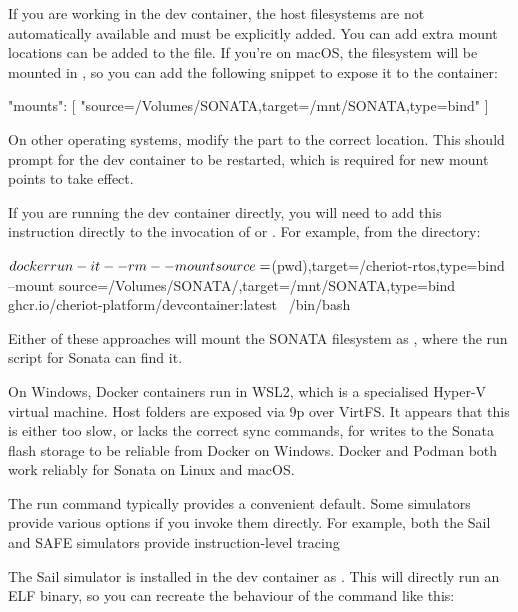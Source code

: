 If you are working in the dev container, the host filesystems are not automatically available and must be explicitly added.
You can add extra mount locations can be added to the  file.
If you're on macOS, the  filesystem will be mounted in , so you can add the following snippet to expose it to the container:

\begin{jsonsnippet}
  "mounts": [
    "source=/Volumes/SONATA,target=/mnt/SONATA,type=bind"
  ]
\end{jsonsnippet}

On other operating systems, modify the  part to the correct location.
This should prompt for the dev container to be restarted, which is required for new mount points to take effect.

If you are running the dev container directly, you will need to add this instruction directly to the invocation of  or .
For example, from the  directory:

\begin{console}
$ docker run -it --rm \\
	--mount source=$(pwd),target=/cheriot-rtos,type=bind \\
	--mount source=/Volumes/SONATA/,target=/mnt/SONATA,type=bind \\
	ghcr.io/cheriot-platform/devcontainer:latest \
	/bin/bash
\end{console}

Either of these approaches will mount the SONATA filesystem as , where the run script for Sonata can find it.

\begin{caution}
	On Windows, Docker containers run in WSL2, which is a specialised Hyper-V virtual machine.
	Host folders are exposed via 9p over VirtFS.
	It appears that this is either too slow, or lacks the correct sync commands, for writes to the Sonata flash storage to be reliable from Docker on Windows.
	Docker and Podman both work reliably for Sonata on Linux and macOS.
\end{caution}

The run command typically provides a convenient default.
Some simulators provide various options if you invoke them directly.
For example, both the Sail and SAFE simulators provide instruction-level tracing

The Sail simulator is installed in the dev container as .
This will directly run an ELF binary, so you can recreate the behaviour of the  command like this:

